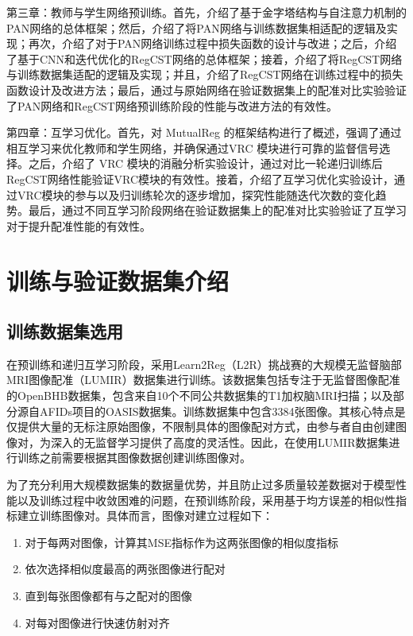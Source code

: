 第三章：教师与学生网络预训练。首先，介绍了基于金字塔结构与自注意力机制的PAN网络的总体框架；然后，介绍了将PAN网络与训练数据集相适配的逻辑及实现；再次，介绍了对于PAN网络训练过程中损失函数的设计与改进；之后，介绍了基于CNN和迭代优化的RegCST网络的总体框架；接着，介绍了将RegCST网络与训练数据集适配的逻辑及实现；并且，介绍了RegCST网络在训练过程中的损失函数设计及改进方法；最后，通过与原始网络在验证数据集上的配准对比实验验证了PAN网络和RegCST网络预训练阶段的性能与改进方法的有效性。

第四章：互学习优化。首先，对 MutualReg 的框架结构进行了概述，强调了通过相互学习来优化教师和学生网络，并确保通过VRC 模块进行可靠的监督信号选择。之后，介绍了 VRC 模块的消融分析实验设计，通过对比一轮递归训练后RegCST网络性能验证VRC模块的有效性。接着，介绍了互学习优化实验设计，通过VRC模块的参与以及归训练轮次的逐步增加，探究性能随迭代次数的变化趋势。最后，通过不同互学习阶段网络在验证数据集上的配准对比实验验证了互学习对于提升配准性能的有效性。

\chapter{训练与验证数据集介绍}

\section{训练数据集选用}

在预训练和递归互学习阶段，采用Learn2Reg（L2R）挑战赛的大规模无监督脑部MRI图像配准（LUMIR）数据集进行训练。该数据集包括专注于无监督图像配准的OpenBHB\cite{dufumier2022openbhb}数据集，包含来自10个不同公共数据集的T1加权脑MRI扫描；以及部分源自AFIDs项目的OASIS\cite{marcus2007open}数据集。训练数据集中包含3384张图像。其核心特点是仅提供大量的无标注原始图像，不限制具体的图像配对方式，由参与者自由创建图像对，为深入的无监督学习提供了高度的灵活性。因此，在使用LUMIR数据集进行训练之前需要根据其图像数据创建训练图像对。

为了充分利用大规模数据集的数据量优势，并且防止过多质量较差数据对于模型性能以及训练过程中收敛困难的问题，在预训练阶段，采用基于均方误差的相似性指标建立训练图像对。具体而言，图像对建立过程如下：

\begin{enumerate}
    \item 对于每两对图像，计算其MSE指标作为这两张图像的相似度指标
    \item 依次选择相似度最高的两张图像进行配对
    \item 直到每张图像都有与之配对的图像
    \item 对每对图像进行快速仿射对齐
\end{enumerate}


